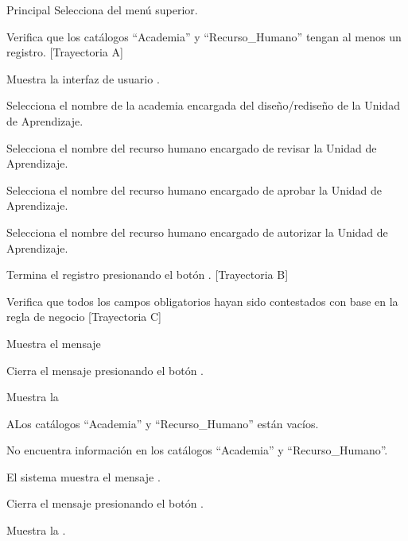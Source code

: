\begin{UCtrayectoria}{Principal}
    \UCpaso[\UCactor] Selecciona  del menú superior.
    
    \UCpaso Verifica que los catálogos ``Academia'' y ``Recurso\_Humano'' tengan al menos un registro. [Trayectoria A]
    
    \UCpaso Muestra la interfaz de usuario .
    
    \UCpaso[\UCactor] Selecciona el nombre de la academia encargada del diseño/rediseño de la Unidad de Aprendizaje. 
    
    \UCpaso[\UCactor] Selecciona el nombre del recurso humano encargado de revisar la Unidad de Aprendizaje.
    
    \UCpaso[\UCactor] Selecciona el nombre del recurso humano encargado de aprobar la Unidad de Aprendizaje.
    
    \UCpaso[\UCactor] Selecciona el nombre del recurso humano encargado de autorizar la Unidad de Aprendizaje.
    
    \UCpaso[\UCactor] Termina el registro presionando el botón . [Trayectoria B]
    
    \UCactor Verifica que todos los campos obligatorios hayan sido contestados con base en la regla de negocio  [Trayectoria C]
    
    \UCpaso Muestra el mensaje 
    
    \UCpaso[\UCactor] Cierra el mensaje presionando el botón .
    
    \UCpaso Muestra la 
\end{UCtrayectoria}


\begin{UCtrayectoriaA}{A}{Los catálogos ``Academia'' y ``Recurso\_Humano'' están vacíos.}

    \UCpaso No encuentra información en los catálogos ``Academia'' y ``Recurso\_Humano''.
    
    \UCpaso El sistema muestra el mensaje .
    
    \UCpaso[\UCactor] Cierra el mensaje presionando el botón .
    
    \UCpaso Muestra la .
\end{UCtrayectoriaA}

